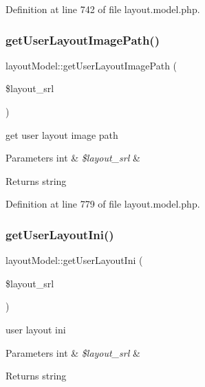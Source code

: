 Definition at line 742 of file layout.\+model.\+php.

\hypertarget{classlayoutModel_a8d7574bcc9329207e6cc1eb2da163288}{}\label{classlayoutModel_a8d7574bcc9329207e6cc1eb2da163288} 
\subsubsection{\texorpdfstring{get\+User\+Layout\+Image\+Path()}{getUserLayoutImagePath()}}
{\footnotesize\ttfamily layout\+Model\+::get\+User\+Layout\+Image\+Path (\begin{DoxyParamCaption}\item[{}]{\$layout\+\_\+srl }\end{DoxyParamCaption})}

get user layout image path 
\begin{DoxyParams}[1]{Parameters}
int & {\em \$layout\+\_\+srl} & \\
\hline
\end{DoxyParams}
\begin{DoxyReturn}{Returns}
string 
\end{DoxyReturn}


Definition at line 779 of file layout.\+model.\+php.

\hypertarget{classlayoutModel_ae52b6a4a0f82631f23b6af7603c0a30e}{}\label{classlayoutModel_ae52b6a4a0f82631f23b6af7603c0a30e} 
\subsubsection{\texorpdfstring{get\+User\+Layout\+Ini()}{getUserLayoutIni()}}
{\footnotesize\ttfamily layout\+Model\+::get\+User\+Layout\+Ini (\begin{DoxyParamCaption}\item[{}]{\$layout\+\_\+srl }\end{DoxyParamCaption})}

user layout ini 
\begin{DoxyParams}[1]{Parameters}
int & {\em \$layout\+\_\+srl} & \\
\hline
\end{DoxyParams}
\begin{DoxyReturn}{Returns}
string 
\end{DoxyReturn}


